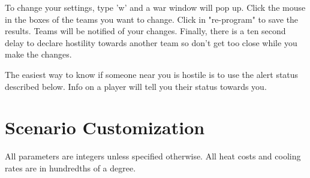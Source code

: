 To change your settings, type 'w' and a war window will pop up.
Click the mouse in the boxes of the teams you want to change.
Click in "re-program" to save the results.  Teams will be notified
of your changes.  Finally, there is a ten second delay to declare
hostility towards another team so don't get too close while you make
the changes.

The easiest way to know if someone near you is hostile is to use
the alert status described below.  Info on a player will tell you
their status towards you.

\section{Scenario Customization}

All parameters are integers unless specified otherwise.
All heat costs and cooling rates are in hundredths of a degree.

